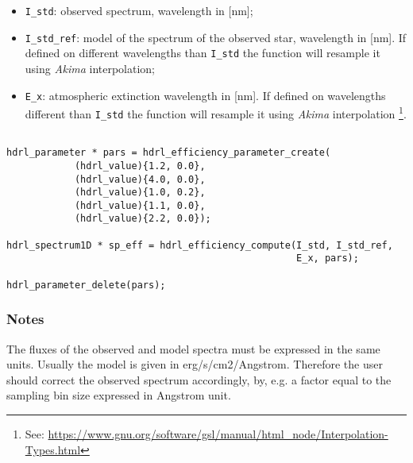 \begin{itemize}
\item \verb+I_std+: observed spectrum, wavelength in [nm];
\item \verb+I_std_ref+: model of the spectrum of the observed star, wavelength in [nm]. If defined on different wavelengths than \verb+I_std+ the function will resample it using \textit{Akima} interpolation;
\item \verb+E_x+: atmospheric extinction wavelength in [nm]. If defined on wavelengths different than \verb+I_std+ the function will resample it using \textit{Akima} interpolation \footnote{See: \url{https://www.gnu.org/software/gsl/manual/html_node/Interpolation-Types.html}}.
\end{itemize}
\begin{lstlisting}

hdrl_parameter * pars = hdrl_efficiency_parameter_create(
            (hdrl_value){1.2, 0.0},
            (hdrl_value){4.0, 0.0},
            (hdrl_value){1.0, 0.2},
            (hdrl_value){1.1, 0.0},
            (hdrl_value){2.2, 0.0});

hdrl_spectrum1D * sp_eff = hdrl_efficiency_compute(I_std, I_std_ref, 
                                                   E_x, pars);

hdrl_parameter_delete(pars); 

\end{lstlisting}

\subsubsection{Notes}
The fluxes of the observed and model spectra must be expressed in the same units. Usually the model is given in  erg/s/cm2/Angstrom. Therefore the user should correct the observed spectrum accordingly, by, e.g. a factor equal to the sampling bin size expressed in Angstrom unit.


